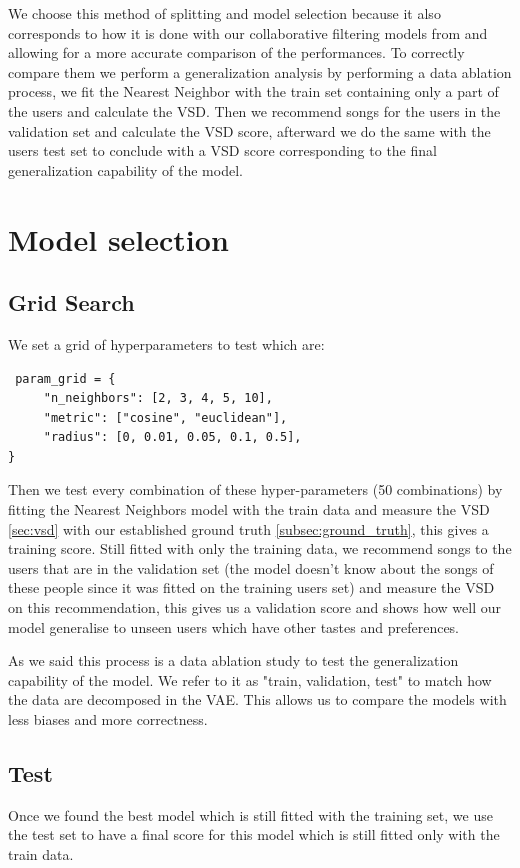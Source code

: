 We choose this method of splitting and model selection because it also corresponds to how it is done with our collaborative filtering models from \cite{liang2018variational} and \cite{johnson_logistic_matrix_factorization} allowing for a more accurate comparison of the performances. To correctly compare them we perform a generalization analysis by performing a data ablation process, we fit the Nearest Neighbor with the train set containing only a part of the users and calculate the VSD. Then we recommend songs for the users in the validation set and calculate the VSD score, afterward we do the same with the users test set to conclude with a VSD score corresponding to the final generalization capability of the model.

\section{Model selection}
\subsection{Grid Search}
We set a grid of hyperparameters to test which are:
\begin{lstlisting}
 param_grid = {
     "n_neighbors": [2, 3, 4, 5, 10],
     "metric": ["cosine", "euclidean"],
     "radius": [0, 0.01, 0.05, 0.1, 0.5],
}
\end{lstlisting}

Then we test every combination of these hyper-parameters (50 combinations) by fitting the Nearest Neighbors model with the train data and measure the VSD \ref{sec:vsd} with our established ground truth \ref{subsec:ground_truth}, this gives a training score. Still fitted with only the training data, we recommend songs to the users that are in the validation set (the model doesn't know about the songs of these people since it was fitted on the training users set) and measure the VSD on this recommendation, this gives us a validation score and shows how well our model generalise to unseen users which have other tastes and preferences.

As we said this process is a data ablation study to test the generalization capability of the model. We refer to it as "train, validation, test" to match how the data are decomposed in the VAE. This allows us to compare the models with less biases and more correctness.

\subsection{Test}
Once we found the best model which is still fitted with the training set, we use the test set to have a final score for this model which is still fitted only with the train data.

